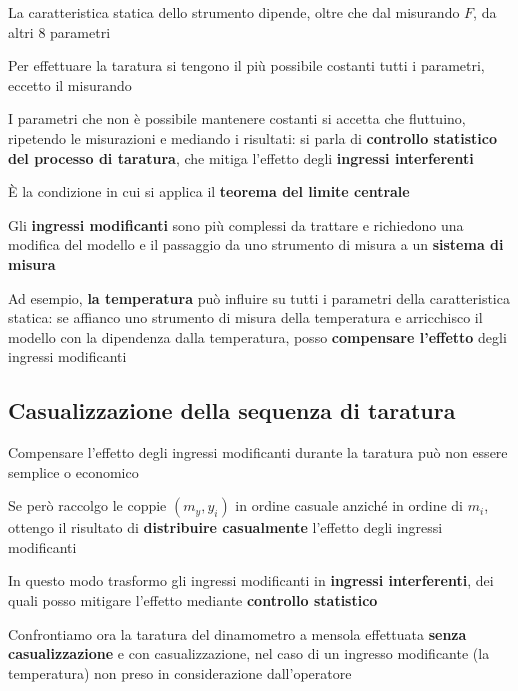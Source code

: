 \documentclass[
  letterpaper,
  DIV=11,
  numbers=noendperiod,
  oneside]{scrartcl}
\begin{document}
La caratteristica statica dello strumento dipende, oltre che dal
misurando \(F\), da altri 8 parametri

Per effettuare la taratura si tengono il più possibile costanti tutti i
parametri, eccetto il misurando

I parametri che non è possibile mantenere costanti si accetta che
fluttuino, ripetendo le misurazioni e mediando i risultati: si parla di
\textbf{controllo statistico del processo di taratura}, che mitiga
l'effetto degli \textbf{ingressi interferenti}

È la condizione in cui si applica il \textbf{teorema del limite
centrale}

Gli \textbf{ingressi modificanti} sono più complessi da trattare e
richiedono una modifica del modello e il passaggio da uno strumento di
misura a un \textbf{sistema di misura}

Ad esempio, \textbf{la temperatura} può influire su tutti i parametri
della caratteristica statica: se affianco uno strumento di misura della
temperatura e arricchisco il modello con la dipendenza dalla
temperatura, posso \textbf{compensare l'effetto} degli ingressi
modificanti


\subsection{Casualizzazione della sequenza di
taratura}\label{casualizzazione-della-sequenza-di-taratura}

Compensare l'effetto degli ingressi modificanti durante la taratura può
non essere semplice o economico

Se però raccolgo le coppie \((m_y, y_i)\) in ordine casuale anziché in
ordine di \(m_i\), ottengo il risultato di \textbf{distribuire
casualmente} l'effetto degli ingressi modificanti

In questo modo trasformo gli ingressi modificanti in \textbf{ingressi
interferenti}, dei quali posso mitigare l'effetto mediante
\textbf{controllo statistico}

Confrontiamo ora la taratura del dinamometro a mensola effettuata
\textbf{senza casualizzazione} e {con casualizzazione}, nel caso di un
ingresso modificante (la temperatura) non preso in considerazione
dall'operatore
\end{document}
